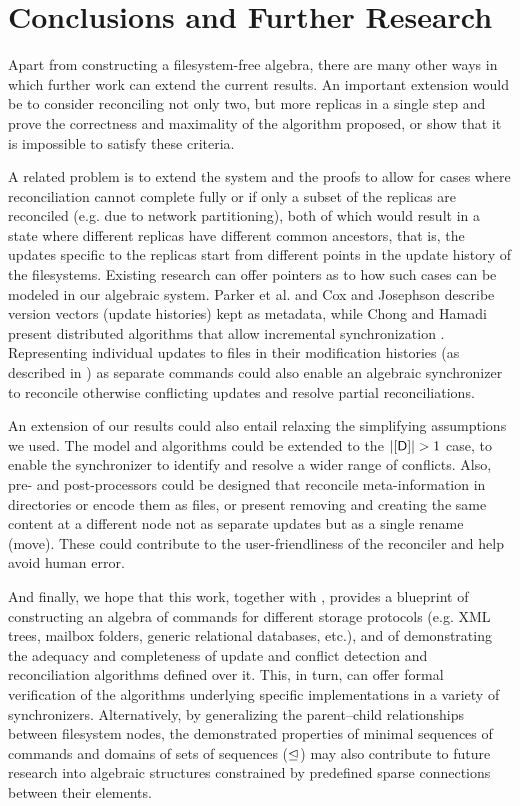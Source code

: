 
\section{Conclusions and Further Research}

Apart from constructing a filesystem-free algebra,
there are many other ways in which further work can extend the current results.
An important extension would be to
consider reconciling not only two, but more replicas in a single step and
prove the correctness and maximality of the algorithm proposed,
or show that it is impossible to satisfy these criteria.

A related problem is to extend the system and the proofs
to allow for cases where reconciliation cannot
complete fully
or if only a subset of the replicas are reconciled 
(e.g. due to network partitioning),
both of which would result in a state where different replicas
have different common ancestors, that is,
the updates specific to the replicas start from different points
in the update history of the filesystems.
Existing research can offer pointers as to how such cases can be modeled
in our algebraic system.
Parker et al. \cite{PPRS} and Cox and Josephson \cite{CJ}
describe version vectors (update histories) kept as metadata,
while Chong and Hamadi present distributed algorithms that allow incremental synchronization \cite{CH}.
Representing individual updates to files
in their modification histories (as described in \cite{CJ})
as separate commands could also enable an algebraic synchronizer to reconcile otherwise
conflicting updates and resolve partial reconciliations.

An extension of our results could also entail relaxing
the simplifying assumptions we used.
The model and algorithms could be extended to the $|\setd|>1$ case, %
to enable the synchronizer
to identify and resolve a wider range of conflicts.
Also, pre- and post-processors could be designed that
reconcile meta-information in directories or encode them as files, %
or present removing and creating the same content at a different node
not as separate updates but as a single rename (move).
These could contribute to the user-friendliness of the reconciler
and help avoid human error.

And finally, we hope that this work, together with \cite{NREC}, provides
a blueprint of constructing an algebra of commands for different storage protocols
(e.g. XML trees, mailbox folders, generic relational databases, etc.),
and of demonstrating the adequacy and completeness of update and conflict detection and reconciliation
algorithms defined over it.
This, in turn, can offer formal verification of the algorithms underlying
specific implementations in a variety of synchronizers.
Alternatively, by generalizing the parent--child relationships between filesystem nodes,
the demonstrated properties of minimal sequences of commands
and domains of sets of sequences ($\trianglelefteq$)
may also contribute to future research into algebraic structures
constrained by predefined sparse connections between their elements.
